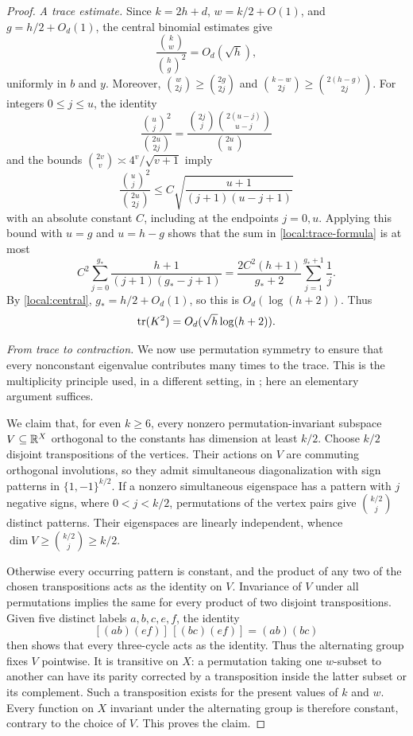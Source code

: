 \begin{proof}
\emph{A trace estimate.}
Since $k=2h+d$, $w=k/2+O(1)$, and
$g=h/2+O_d(1)$, the central binomial estimates give
\begin{equation}
  \frac{\binom kw}{\binom hg^2}=O_d(\sqrt h),
  \label{local:central-ratio}
\end{equation}
uniformly in $b$ and $y$.  Moreover,
$\binom w{2j}\ge\binom{2g}{2j}$ and
$\binom{k-w}{2j}\ge\binom{2(h-g)}{2j}$.
For integers $0\le j\le u$, the identity
\[
  \frac{\binom uj^2}{\binom{2u}{2j}}
  =\frac{\binom{2j}j\binom{2(u-j)}{u-j}}{\binom{2u}u}
\]
and the bounds $\binom{2v}v\asymp4^v/\sqrt{v+1}$ imply
\begin{equation}
  \frac{\binom uj^2}{\binom{2u}{2j}}
   \le C\sqrt{\frac{u+1}{(j+1)(u-j+1)}}
  \label{local:binomial-ratio}
\end{equation}
with an absolute constant $C$, including at the endpoints $j=0,u$.
Applying this bound with $u=g$ and $u=h-g$ shows that the sum in
\eqref{local:trace-formula} is at most
\[
  C^2\sum_{j=0}^{g_*}
    \frac{h+1}{(j+1)(g_*-j+1)}
  =\frac{2C^2(h+1)}{g_*+2}\sum_{j=1}^{g_*+1}\frac1j.
\]
By \eqref{local:central}, $g_*=h/2+O_d(1)$, so this is
$O_d(\log(h+2))$.  Thus
\begin{equation}
  \operatorname{tr}(K^2)=O_d(\sqrt h\log(h+2)).
  \label{local:trace-bound}
\end{equation}

\emph{From trace to contraction.}
We now use permutation symmetry to ensure that every nonconstant
eigenvalue contributes many times to the trace.  This is the
multiplicity principle used, in a different setting, in
\cite[Lemma~3.2]{gowers}; here an elementary argument suffices.

We claim that, for even $k\ge6$, every nonzero permutation-invariant
subspace $V\subseteq\mathbb R^X$ orthogonal to the constants has dimension
at least $k/2$.  Choose $k/2$ disjoint transpositions of the vertices.
Their actions on $V$ are commuting orthogonal involutions, so they
admit simultaneous diagonalization with sign patterns in
$\{1,-1\}^{k/2}$.  If a nonzero simultaneous eigenspace has a pattern
with $j$ negative signs, where $0<j<k/2$, permutations of the vertex
pairs give $\binom{k/2}j$ distinct patterns.  Their eigenspaces are
linearly independent, whence
$\dim V\ge\binom{k/2}j\ge k/2$.

Otherwise every occurring pattern is constant, and the product of
any two of the chosen transpositions acts as the identity on $V$.
Invariance of $V$ under all permutations implies the same for every
product of two disjoint transpositions.  Given five distinct labels
$a,b,c,e,f$, the identity
\[
  [(ab)(ef)]\,[(bc)(ef)]=(ab)(bc)
\]
then shows that every three-cycle acts as the identity.  Thus the
alternating group fixes $V$ pointwise.  It is transitive on $X$:
a permutation taking one $w$-subset to another can have its parity
corrected by a transposition inside the latter subset or its
complement.  Such a transposition exists for the present values of
$k$ and $w$.  Every function on $X$ invariant under the alternating
group is therefore constant, contrary to the choice of $V$.
This proves the claim.


\end{proof}
